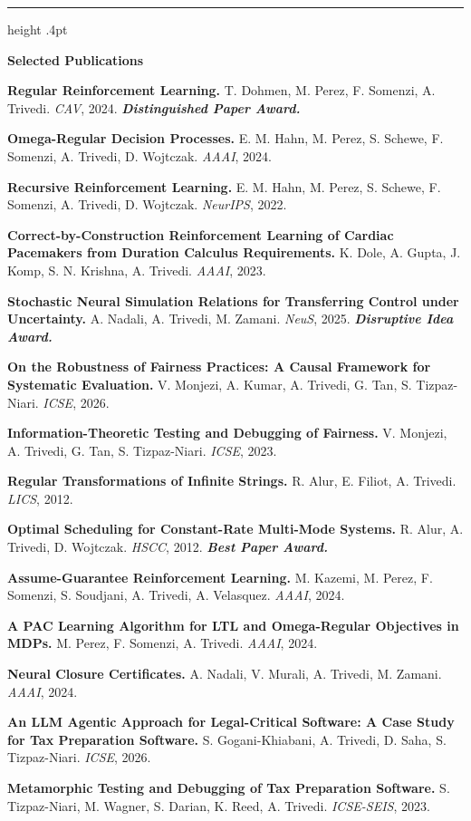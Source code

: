 \documentclass[10pt,letterpaper]{article}
\newcommand{\cvsection}[1]{%
  \par\vspace{7bp}\hrule height .4pt\vspace{5.2bp}%
  {\fontsize{11.5}{13.2}\selectfont\bfseries #1\par}\vspace{3bp}}
\newcommand{\pubaward}[1]{{\color{awardgreen}\bfseries\itshape #1}}
\newcommand{\smallgap}{\par\vspace{6.4bp}}
\begin{document}
\begin{minipage}[t]{0.525\textwidth}
\vspace{0pt}
\cvsection{Selected Publications}

\textbf{Regular Reinforcement Learning.} T. Dohmen, M. Perez, F. Somenzi, A. Trivedi. \textit{CAV}, 2024. \pubaward{Distinguished Paper Award.}
\smallgap

\textbf{Omega-Regular Decision Processes.} E. M. Hahn, M. Perez, S. Schewe, F. Somenzi, A. Trivedi, D. Wojtczak. \textit{AAAI}, 2024.
\smallgap

\textbf{Recursive Reinforcement Learning.} E. M. Hahn, M. Perez, S. Schewe, F. Somenzi, A. Trivedi, D. Wojtczak. \textit{NeurIPS}, 2022.
\smallgap

\textbf{Correct-by-Construction Reinforcement Learning of Cardiac Pacemakers from Duration Calculus Requirements.} K. Dole, A. Gupta, J. Komp, S. N. Krishna, A. Trivedi. \textit{AAAI}, 2023.
\smallgap

\textbf{Stochastic Neural Simulation Relations for Transferring Control under Uncertainty.} A. Nadali, A. Trivedi, M. Zamani. \textit{NeuS}, 2025. \pubaward{Disruptive Idea Award.}
\smallgap

\textbf{On the Robustness of Fairness Practices: A Causal Framework for Systematic Evaluation.} V. Monjezi, A. Kumar, A. Trivedi, G. Tan, S. Tizpaz-Niari. \textit{ICSE}, 2026.
\smallgap

\textbf{Information-Theoretic Testing and Debugging of Fairness.} V. Monjezi, A. Trivedi, G. Tan, S. Tizpaz-Niari. \textit{ICSE}, 2023.
\smallgap

\textbf{Regular Transformations of Infinite Strings.} R. Alur, E. Filiot, A. Trivedi. \textit{LICS}, 2012.
\smallgap

\textbf{Optimal Scheduling for Constant-Rate Multi-Mode Systems.} R. Alur, A. Trivedi, D. Wojtczak. \textit{HSCC}, 2012. \pubaward{Best Paper Award.}
\smallgap

\textbf{Assume-Guarantee Reinforcement Learning.} M. Kazemi, M. Perez, F. Somenzi, S. Soudjani, A. Trivedi, A. Velasquez. \textit{AAAI}, 2024.
\smallgap

\textbf{A PAC Learning Algorithm for LTL and Omega-Regular Objectives in MDPs.} M. Perez, F. Somenzi, A. Trivedi. \textit{AAAI}, 2024.
\smallgap

\textbf{Neural Closure Certificates.} A. Nadali, V. Murali, A. Trivedi, M. Zamani. \textit{AAAI}, 2024.
\smallgap

\textbf{An LLM Agentic Approach for Legal-Critical Software: A Case Study for Tax Preparation Software.} S. Gogani-Khiabani, A. Trivedi, D. Saha, S. Tizpaz-Niari. \textit{ICSE}, 2026.
\smallgap

\textbf{Metamorphic Testing and Debugging of Tax Preparation Software.} S. Tizpaz-Niari, M. Wagner, S. Darian, K. Reed, A. Trivedi. \textit{ICSE-SEIS}, 2023.
\end{minipage}
\end{document}
